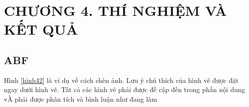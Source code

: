 \documentclass{article}%
\begin{document}
\section*{CHƯƠNG 4. THÍ NGHIỆM VÀ KẾT QUẢ}
\setcounter{section}{4}
\setcounter{equation}{0}

\setcounter{subsection}{0} %
\setcounter{table}{0} %
\setcounter{figure}{0} %
\subsection{ABF}
\lipsum

Hình \ref{hinh42} là ví dụ về cách chèn ảnh. Lưu ý chú thích của hình vẽ được đặt ngay dưới hình vẽ. Tất cả các hình vẽ 
phải được đề cập đến trong phần nội  dung vÀ phải được phân tích và bình luận như đang làm
\end{document}

